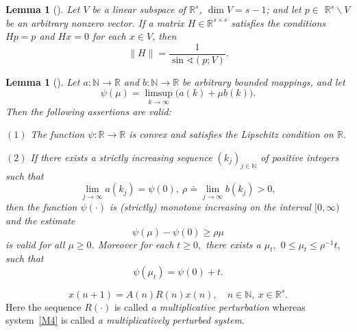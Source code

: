 \documentclass[10pt,a4paper]{amsart}
\theoremstyle{plain}
\newtheorem{lemma}[theorem]{Lemma}
\begin{document}
\setcounter{section}{2}
\setcounter{theorem}{1}
\begin{lemma}[\protect\cite{Popova2003}]
\label{L3}
\it
Let $V$ be a linear subspace of $\mathbb{R}^{s}$, $\dim V=s-1$;
and let $p\in $ $\mathbb{R}^{s}\backslash V$ be an arbitrary nonzero vector.
If a matrix $H\in \mathbb{R}^{s\times s}$ satisfies the conditions $Hp=p$
and $Hx=0$ for each $x\in V$, then %
\begin{equation*}
\| H\| =\dfrac{1}{\sin \sphericalangle (p;V)}.
\end{equation*}
\end{lemma}

\begin{lemma}[\protect\cite{Popova2003}]
\label{L2}
\it
Let $a\colon \mathbb{N}\to \mathbb{R}$ and $b\colon 
\mathbb{N}\to \mathbb{R}$ be arbitrary bounded mappings, and let 
\begin{equation*}
\psi (\mu )=\limsup_{k\to \infty }\bigl(a(k)+\mu b(k)\bigr).
\end{equation*}%
Then the following assertions are valid:

$(1)$ The function $\psi\colon\mathbb{R}\to\mathbb{R}$ is convex and
satisfies the Lipschitz condition on $\mathbb{R}$.

$(2)$ If there exists a strictly increasing sequence $( k_{j})
_{j\in \mathbb{N}}$ of positive integers such that%
\begin{equation*}
\lim_{j\to \infty }a( k_{j}) =\psi ( 0) ,\
\rho \doteq \lim_{j\to \infty }b(k_{j})>0,
\end{equation*}%
then the function $\psi (\cdot )$ is (strictly) monotone increasing on the
interval $[ 0,\infty ) $ and the estimate%
\begin{equation*}
\psi ( \mu ) -\psi ( 0) \ge \rho \mu
\end{equation*}%
is valid for all $\mu \ge 0$. Moreover for each $t\ge 0,$ there exists a $%
\mu _{t},$ $0\le \mu _{t}\le \rho ^{-1}t,$ such that 
\begin{equation*}
\psi ( \mu _{t}) =\psi ( 0) +t.
\end{equation*}
\end{lemma}

\setcounter{equation}{7}
\begin{equation}
x(n+1)=A(n)R(n)x(n),\quad n\in \mathbb{N},\ x\in \mathbb{R}^{s}.  \label{M4}
\end{equation}%
Here the sequence $R(\cdot )$ is called \emph{a multiplicative perturbation%
} whereas system~\eqref{M4} is called  \emph{a multiplicatively perturbed
system}. 
\end{document}
